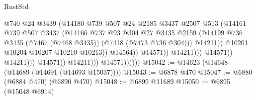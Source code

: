 \begin{lexlean}{RustStd}
\begin{coremodule}
                                                    @740
                                                    @24
                                                    @3439
                                                    (@14180
                                                      @739
                                                      @507
                                                      @24
                                                      @2185
                                                      @3437
                                                      @2507
                                                      @513
                                                      (@14161
                                                        @739
                                                        @507
                                                        @3437
                                                        (@14166
                                                          @737
                                                          @93
                                                          @304
                                                          @27
                                                          @3435
                                                          @2159
                                                          (@14199
                                                            @736
                                                            @3435
                                                            (@7467 (@7468 @3435))
                                                            (@7418 (@7473 @736 @304)))
                                                          @14211))
                                                      @10201
                                                      @10204
                                                      @10207
                                                      @10210
                                                      @10213))
                                                  @14564))
                                              @14571))
                                          @14211)))
                                    @14571))
                                @14211)))
                          @14571))
                      @14211)))
                @14571))))))
@15042 := @14623 (@14648 (@14689 (@14691 (@14693 @15037))))
@15043 := @6878 @470
@15047 := @6880 (@6884 @470) (@6890 @470)
@15048 := @6899 @11689
@15050 := @6895 (@15048 @6914)

\end{coremodule}
\end{lexlean}
